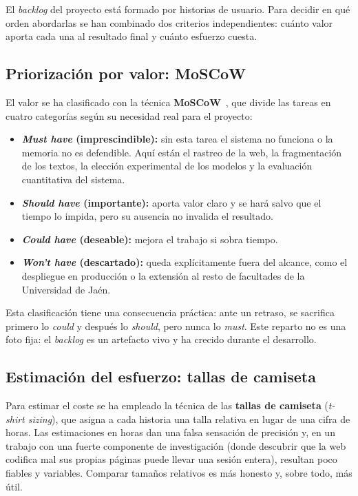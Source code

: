 El \textit{backlog} del proyecto está formado por historias de usuario. Para decidir en qué orden abordarlas se han
combinado dos criterios independientes: cuánto valor aporta cada una al resultado
final y cuánto esfuerzo cuesta.

\subsection{Priorización por valor: MoSCoW}
\label{secc:moscow}

El valor se ha clasificado con la técnica \textbf{MoSCoW}~\cite{moscow}, que
divide las tareas en cuatro categorías según su necesidad real para el
proyecto:

\begin{itemize}                                                                                                                                                    
  \item \textbf{\textit{Must have} (imprescindible):} sin esta tarea el
        sistema no funciona o la memoria no es defendible. Aquí están el rastreo de la
        web, la fragmentación de los textos, la elección experimental de los
        modelos y la evaluación cuantitativa del sistema.
  \item \textbf{\textit{Should have} (importante):} aporta valor claro y se
        hará salvo que el tiempo lo impida, pero su ausencia no invalida el
        resultado.
  \item \textbf{\textit{Could have} (deseable):} mejora el trabajo si sobra
        tiempo.
  \item \textbf{\textit{Won't have} (descartado):} queda explícitamente fuera
        del alcance, como el despliegue en producción o la extensión al resto de
        facultades de la Universidad de Jaén.
\end{itemize}

Esta clasificación tiene una consecuencia práctica: ante un retraso, se sacrifica
primero lo \textit{could} y después lo \textit{should}, pero nunca lo
\textit{must}. Este reparto no es una foto fija:
el \textit{backlog} es un artefacto vivo y ha crecido durante el desarrollo.


\subsection{Estimación del esfuerzo: tallas de camiseta}

Para estimar el coste se ha empleado la técnica de las \textbf{tallas de
  camiseta} (\textit{t-shirt sizing}), que asigna a cada historia una talla
relativa en lugar de una cifra de horas. Las estimaciones en horas dan una falsa sensación de precisión y,
en un trabajo con una fuerte componente de investigación (donde descubrir que la web codifica mal sus propias páginas puede llevar una sesión entera), resultan poco
fiables y variables. Comparar tamaños relativos es más honesto y, sobre todo, más útil.

